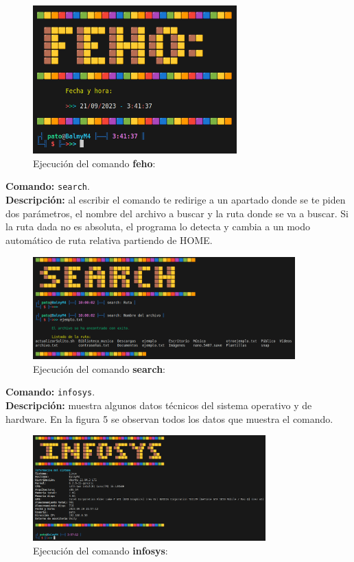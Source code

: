 \documentclass[titlepage]{article}
\begin{document}
\begin{figure}[H]
    \centering
    \includegraphics[width=0.7\textwidth]{feho.png}
    \caption{Ejecución del comando \textbf{feho}:}
    \label{fig:ejemplo}
\end{figure}

\noindent
\textbf{Comando:} \verb|search|. \\
\textbf{Descripción:} al escribir el comando te redirige a un apartado donde se te piden dos parámetros, el nombre del archivo a buscar y la ruta donde se va a buscar. Si la ruta dada no es absoluta, el programa lo detecta y cambia a un modo automático de ruta relativa partiendo de HOME.

\begin{figure}[H]
    \centering
    \includegraphics[width=0.9\textwidth]{search.png}
    \caption{Ejecución del comando \textbf{search}:}
    \label{fig:ejemplo}
\end{figure}

\noindent
\textbf{Comando:} \verb|infosys|. \\
\textbf{Descripción:} muestra algunos datos técnicos del sistema operativo y de hardware. En la figura 5 se observan todos los datos que muestra el comando.

\begin{figure}[H]
    \centering
    \includegraphics[width=0.8\textwidth]{infosys.png}
    \caption{Ejecución del comando \textbf{infosys}:}
    \label{fig:ejemplo}
\end{figure}
\end{document}

